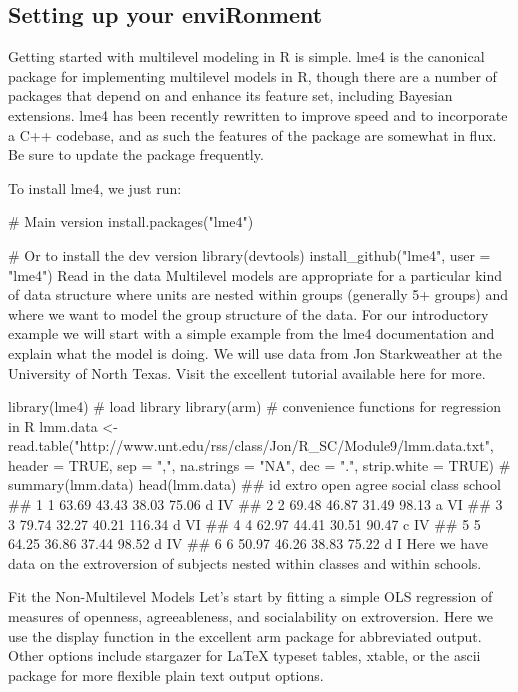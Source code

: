 
\subsection*{Setting up your enviRonment}

Getting started with multilevel modeling in R is simple. lme4 is the canonical package for implementing multilevel models in R, though there are a number of packages that depend on and enhance its feature set, including Bayesian extensions. lme4 has been recently rewritten to improve speed and to incorporate a C++ codebase, and as such the features of the package are somewhat in flux. Be sure to update the package frequently.

To install lme4, we just run:

# Main version
install.packages("lme4")

# Or to install the dev version
library(devtools)
install_github("lme4", user = "lme4")
Read in the data
Multilevel models are appropriate for a particular kind of data structure where units are nested within groups (generally 5+ groups) and where we want to model the group structure of the data. For our introductory example we will start with a simple example from the lme4 documentation and explain what the model is doing. We will use data from Jon Starkweather at the University of North Texas. Visit the excellent tutorial available here for more.

library(lme4)  # load library
library(arm)  # convenience functions for regression in R
lmm.data <- read.table("http://www.unt.edu/rss/class/Jon/R_SC/Module9/lmm.data.txt", 
    header = TRUE, sep = ",", na.strings = "NA", dec = ".", strip.white = TRUE)
# summary(lmm.data)
head(lmm.data)
##   id extro  open agree social class school
## 1  1 63.69 43.43 38.03  75.06     d     IV
## 2  2 69.48 46.87 31.49  98.13     a     VI
## 3  3 79.74 32.27 40.21 116.34     d     VI
## 4  4 62.97 44.41 30.51  90.47     c     IV
## 5  5 64.25 36.86 37.44  98.52     d     IV
## 6  6 50.97 46.26 38.83  75.22     d      I
Here we have data on the extroversion of subjects nested within classes and within schools.

Fit the Non-Multilevel Models
Let's start by fitting a simple OLS regression of measures of openness, agreeableness, and socialability on extroversion. Here we use the display function in the excellent arm package for abbreviated output. Other options include stargazer for LaTeX typeset tables, xtable, or the ascii package for more flexible plain text output options.

